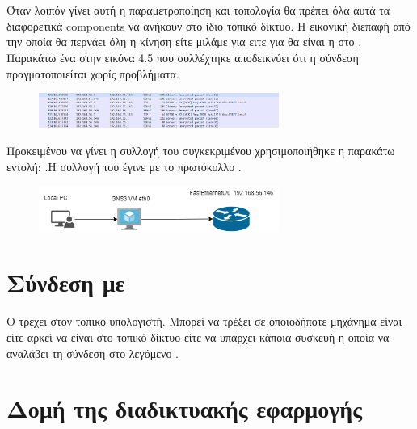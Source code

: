 \section{ }


Όταν λοιπόν γίνει αυτή η παραμετροποίηση και τοπολογία θα πρέπει όλα αυτά τα διαφορετικά components να ανήκουν στο ίδιο τοπικό δίκτυο.
Η εικονική διεπαφή από την οποία θα περνάει όλη η κίνηση είτε μιλάμε για  ειτε για  θα είναι η  στο . Παρακάτω ένα 
 στην εικόνα 4.5 που συλλέχτηκε αποδεικνύει ότι η σύνδεση πραγματοποιείται χωρίς προβλήματα.

\begin{figure}[htb]
	\centering
	\includegraphics[width=0.7\textwidth]{graphics/ssh_connection.png}
	\caption{ }
\end{figure}


Προκειμένου να γίνει η συλλογή του συγκεκριμένου  χρησιμοποιήθηκε η παρακάτω εντολή:
.Η συλλογή του  έγινε με το πρωτόκολλο .


\begin{figure}[h]
	\centering
	\includegraphics[width=0.7\textwidth]{graphics/jason1.png}
	\caption{ }
\end{figure}

\FloatBarrier

\section{Σύνδεση με  }

Ο  τρέχει στον τοπικό υπολογιστή. Μπορεί να τρέξει σε οποιοδήποτε
μηχάνημα είναι  είτε  αρκεί να είναι στο τοπικό δίκτυο
είτε να υπάρχει κάποια συσκευή  η οποία να αναλάβει τη σύνδεση στο λεγόμενο
.

\section{Δομή της διαδικτυακής εφαρμογής  }


